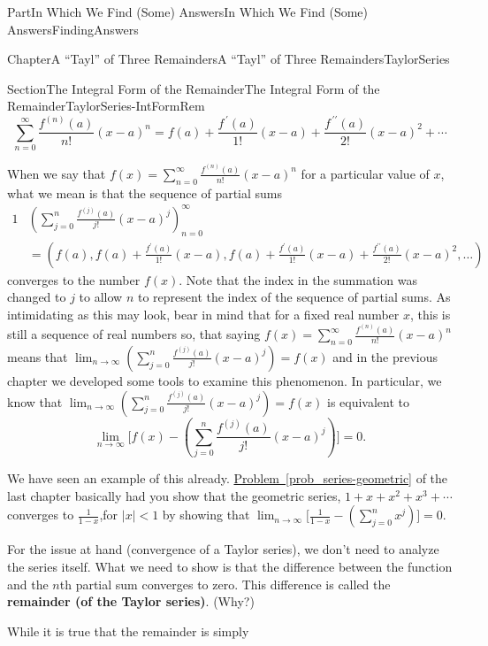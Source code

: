 \documentclass[oneside,10pt,]{book}
\newcommand{\xreffont}{\relax}
\newcommand{\terminology}[1]{\textbf{#1}}
\numberwithin{equation}{part}
\def\limit#1#2#3{{\displaystyle\lim_{#1\rightarrow #2}#3}}
\newcommand{\lt}{<}
\newcommand{\amp}{&}
\begin{document}
\begin{partptx}{Part}{In Which We Find (Some) Answers}{}{In Which We Find (Some) Answers}{}{}{FindingAnswers}
\begin{chapterptx}{Chapter}{A ``Tayl'' of Three Remainders}{}{A ``Tayl'' of Three Remainders}{}{}{TaylorSeries}
\begin{sectionptx}{Section}{The Integral Form of the Remainder}{}{The Integral Form of the Remainder}{}{}{TaylorSeries-IntFormRem}
\begin{equation*}
\sum_{n=0}^\infty\frac{f^{(n)}(a)}{n!}(x-a)^n=f(a)+\frac{f^{\,\prime}(a)}{1!}(x-a)+\frac{f^{\,\prime\prime}(a)}{2!}(x-a)^2+\cdots
\end{equation*}
%
\par
When we say that \(f(x)=\sum_{n=0}^\infty\frac{f^{(n)}(a)}{n!}(x-a)^n\) for a particular value of \(x\), what we mean is that the sequence of partial sums%
\begin{alignat*}{1}
\amp\left(\sum_{j=0}^n\frac{f^{(j)}(a)}{j!}(x-a)^j\right)_{n=0}^\infty\\
\amp= \left(f(a), f(a)+\frac{f^{\prime}(a)}{1!}(x-a),f(a)
+\frac{f^{\prime}(a)}{1!}(x-a)+\frac{f^{\prime\prime}(a)}{2!}(x-a)^2,\ldots\right)
\end{alignat*}
converges to the number \(f(x)\). Note that the index in the summation was changed to \(j\) to allow \(n\) to represent the index of the sequence of partial sums. As intimidating as this may look, bear in mind that for a fixed real number \(x\), this is still a sequence of real numbers so, that saying \(f(x)=\sum_{n=0}^\infty\frac{f^{(n)}(a)}{n!}(x-a)^n\) means that \(\lim_{n\rightarrow\infty}\left(\sum_{j=0}^n\frac{f^{(j)}(a)}{j!}(x-a)^j\right)=f(x)\) and in the previous chapter we developed some tools to examine this phenomenon. In particular, we know that \(\lim_{n\rightarrow\infty}\left(\sum_{j=0}^n\frac{f^{(j)}(a)}{j!}(x-a)^j\right)=f(x)\) is equivalent to%
\begin{equation*}
\lim_{n\rightarrow\infty}\Biggl[f(x)-\left(\sum_{j=0}^n \frac{f^{(j)}(a)}{j!}(x-a)^j\right)\Biggr]=0\text{.}
\end{equation*}
%
\par
We have seen an example of this already. \hyperref[prob_series-geometric]{Problem~{\xreffont\ref{prob_series-geometric}}} of the last chapter basically had you show that  the geometric series, \(1+x+x^2+x^3+\cdots\) converges to \(\frac{1}{1-x}\),for \(|x|\lt 1\) by showing that \(\limit{n}{\infty}{\Biggl[\frac{1}{1-x}-\left(\sum_{j=0}^nx^j\right)\Biggr]=0}\).%
\par
For the issue at hand (convergence of a Taylor series), we don't need to analyze the series itself.  What we need to show is that the difference between the function and the \(n\)th partial sum converges to zero.  This difference is called the \terminology{remainder (of the Taylor series)}. (Why?)%
\par
While it is true that the remainder is simply%
\begin{equation*}

\end{equation*}
\end{sectionptx}
\end{chapterptx}
\end{partptx}
\end{document}
